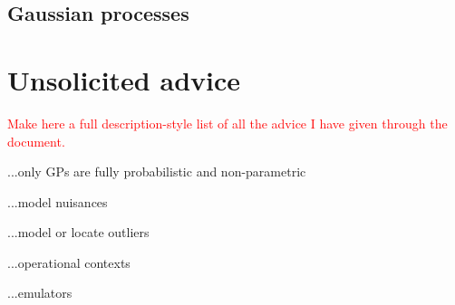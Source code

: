 \documentclass[12pt, twoside, letterpaper]{article}
\newcommand{\todo}[1]{\textcolor{red}{#1}}  %
\begin{document}
\subsection{Gaussian processes}

\section{Unsolicited advice}\label{sec:advice}

\todo{Make here a full description-style list of all the
  advice I have given through the document.}

...only GPs are fully probabilistic and non-parametric

...model nuisances

...model or locate outliers

...operational contexts

...emulators
\end{document}

